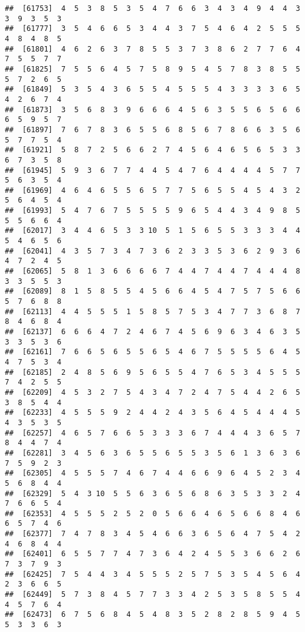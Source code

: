 \documentclass[
]{book}
\begin{document}
\begin{verbatim}
##  [61753]  4  5  3  8  5  3  5  4  7  6  6  3  4  3  4  9  4  4  3  3  9  3  5  3
##  [61777]  3  5  4  6  6  5  3  4  4  3  7  5  4  6  4  2  5  5  5  4  8  4  8  5
##  [61801]  4  6  2  6  3  7  8  5  5  3  7  3  8  6  2  7  7  6  4  7  5  5  7  7
##  [61825]  7  5  5  6  4  5  7  5  8  9  5  4  5  7  8  3  8  5  5  5  7  2  6  5
##  [61849]  5  3  5  4  3  6  5  5  4  5  5  5  4  3  3  3  3  6  5  4  2  6  7  4
##  [61873]  3  5  6  8  3  9  6  6  6  4  5  6  3  5  5  6  5  6  6  6  5  9  5  7
##  [61897]  7  6  7  8  3  6  5  5  6  8  5  6  7  8  6  6  3  5  6  5  7  7  5  4
##  [61921]  5  8  7  2  5  6  6  2  7  4  5  6  4  6  5  6  5  3  3  6  7  3  5  8
##  [61945]  5  9  3  6  7  7  4  4  5  4  7  6  4  4  4  4  5  7  7  5  6  3  5  4
##  [61969]  4  6  4  6  5  5  6  5  7  7  5  6  5  5  4  5  4  3  2  5  6  4  5  4
##  [61993]  5  4  7  6  7  5  5  5  5  9  6  5  4  4  3  4  9  8  5  5  5  6  6  4
##  [62017]  3  4  4  6  5  3  3 10  5  1  5  6  5  5  3  3  3  4  4  5  4  6  5  6
##  [62041]  4  3  5  7  3  4  7  3  6  2  3  3  5  3  6  2  9  3  6  4  7  2  4  5
##  [62065]  5  8  1  3  6  6  6  6  7  4  4  7  4  4  7  4  4  4  8  3  3  5  5  3
##  [62089]  8  1  5  8  5  5  4  5  6  6  4  5  4  7  5  7  5  6  6  5  7  6  8  8
##  [62113]  4  4  5  5  5  1  5  8  5  7  5  3  4  7  7  3  6  8  7  8  4  6  8  4
##  [62137]  6  6  6  4  7  2  4  6  7  4  5  6  9  6  3  4  6  3  5  3  3  5  3  6
##  [62161]  7  6  6  5  6  5  5  6  5  4  6  7  5  5  5  5  6  4  5  4  7  5  3  4
##  [62185]  2  4  8  5  6  9  5  6  5  5  4  7  6  5  3  4  5  5  5  7  4  2  5  5
##  [62209]  4  5  3  2  7  5  4  3  4  7  2  4  7  5  4  4  2  6  5  3  8  5  4  4
##  [62233]  4  5  5  5  9  2  4  4  2  4  3  5  6  4  5  4  4  4  5  4  3  5  3  5
##  [62257]  4  6  5  7  6  6  5  3  3  3  6  7  4  4  4  3  6  5  7  8  4  4  7  4
##  [62281]  3  4  5  6  3  6  5  5  6  5  5  3  5  6  1  3  6  3  6  7  5  9  2  3
##  [62305]  4  5  5  5  7  4  6  7  4  4  6  6  9  6  4  5  2  3  4  5  6  8  4  4
##  [62329]  5  4  3 10  5  5  6  3  6  5  6  8  6  3  5  3  3  2  4  7  6  6  5  4
##  [62353]  4  5  5  5  2  5  2  0  5  6  6  4  6  5  6  6  8  4  6  6  5  7  4  6
##  [62377]  7  4  7  8  3  4  5  4  6  6  3  6  5  6  4  7  5  4  2  4  6  8  4  4
##  [62401]  6  5  5  7  7  4  7  3  6  4  2  4  5  5  3  6  6  2  6  7  3  7  9  3
##  [62425]  7  5  4  4  3  4  5  5  5  2  5  7  5  3  5  4  5  6  4  2  3  6  6  5
##  [62449]  5  7  3  8  4  5  7  7  3  3  4  2  5  3  5  8  5  5  4  4  5  7  6  4
##  [62473]  6  7  5  6  8  4  5  4  8  3  5  2  8  2  8  5  9  4  5  5  3  3  6  3

\end{verbatim}
\end{document}
